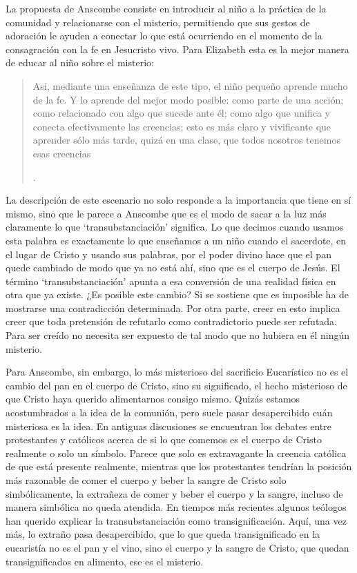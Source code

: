 La propuesta de Anscombe consiste en introducir al niño a la práctica de la comunidad y relacionarse con el misterio, permitiendo que sus gestos de adoración le ayuden a conectar lo que está ocurriendo en el momento de la consagración con la fe en Jesucristo vivo. Para Elizabeth esta es la mejor manera de educar al niño sobre el misterio: \blockquote[{\Cite[86]{torralbaynubiola2005fayeh:ot}}.
]{Así, mediante una enseñanza de este tipo, el niño pequeño aprende mucho de la fe. Y lo aprende del mejor modo posible: como parte de una acción; como relacionado con algo que sucede ante él; como algo que unifica y conecta efectivamente las creencias; esto es más claro y vivificante que aprender sólo más tarde, quizá en una clase, que todos nosotros tenemos esas creencias}.

La descripción de este escenario no solo responde a la importancia que tiene en sí mismo, sino que le parece a Anscombe que es el modo de sacar a la luz más claramente lo que `transubstanciación' significa. Lo que decimos cuando usamos esta palabra es exactamente lo que enseñamos a un niño cuando el sacerdote, en el lugar de Cristo y usando sus palabras, por el poder divino hace que el pan quede cambiado de modo que ya no está ahí, sino que es el cuerpo de Jesús. El término `transubstanciación' apunta a esa conversión de una realidad física en otra que ya existe. ¿Es posible este cambio? Si se sostiene que es imposible ha de mostrarse una contradicción determinada. Por otra parte, creer en esto implica creer que toda pretensión de refutarlo como contradictorio puede ser refutada. Para ser creído no necesita ser expuesto de tal modo que no hubiera en él ningún misterio.

Para Anscombe, sin embargo, lo más misterioso del sacrificio Eucarístico no es el cambio del pan en el cuerpo de Cristo, sino su significado, el hecho misterioso de que Cristo haya querido alimentarnos consigo mismo. Quizás estamos acostumbrados a la idea de la comunión, pero suele pasar desapercibido cuán misteriosa es la idea. En antiguas discusiones se encuentran los debates entre protestantes y católicos acerca de si lo que comemos es el cuerpo de Cristo realmente o solo un símbolo. Parece que solo es extravagante la creencia católica de que está presente realmente, mientras que los protestantes tendrían la posición más razonable de comer el cuerpo y beber la sangre de Cristo solo simbólicamente, la extrañeza de comer y beber el cuerpo y la sangre, incluso de manera simbólica no queda atendida. En tiempos más recientes algunos teólogos han querido explicar la transubstanciación como transignificación. Aquí, una vez más, lo extraño pasa desapercibido, que lo que queda transignificado en la eucaristía no es el pan y el vino, sino el cuerpo y la sangre de Cristo, que quedan transignificados en alimento, ese es el misterio.

